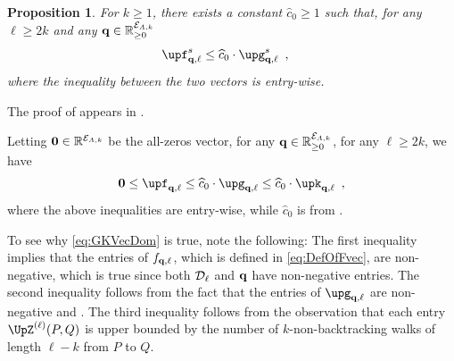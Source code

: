 \documentclass[11pt,reqno]{amsart}
\numberwithin{equation}{section}
\newtheorem{proposition}[theorem]{Proposition}
\newcommand{\cE}{{\mathcal{E}}}
\newcommand{\applegreen}[1]{ {\color{applegreen}#1}}
\newcommand{\amethyst}[1]{{\color{amethyst}#1} }
\newcommand{\bluepigment}[1]{{\color{blue(pigment)}#1}}
\newcommand{\darkmagenta}[1]{{\color{darkmagenta}#1}}
\newcommand{\goldenbrown}[1]{{\color{goldenbrown}#1}}
\newcommand{\iris}[1]{{\color{iris}#1}}
\newcommand{\ExtV}{\iris{\cE}}
\newcommand{\pfs}{\darkmagenta{s}}
\renewcommand{\applegreen}[1]{#1}
\renewcommand{\amethyst}[1]{#1}
\renewcommand{\bluepigment}[1]{#1}
\renewcommand{\darkmagenta}[1]{#1}
\renewcommand{\goldenbrown}[1]{#1}
\renewcommand{\iris}[1]{#1}
\newcommand{\kk}{\bluepigment{k}}
\newcommand{\kell}{{\color{green(pigment)}\ell}}%
\newcommand{\kP}{\goldenbrown{P}}
\newcommand{\kQ}{\amethyst{Q}}
\renewcommand{\kk}{k}
\renewcommand{\kell}{\ell}
\renewcommand{\kP}{P}
\renewcommand{\kQ}{Q}
\begin{document}
\begin{proposition}\label{thrm:HC-VEntryBound}
For $\kk\geq 1$, there exists a constant $\widehat{c}_0\geq 1$ such that, for any $\kell\geq 2\kk$
 and any $\vtest \in \mathbb{R}^{\ExtV_{\Lambda,\kk}}_{\geq 0}$
\begin{align}\label{eq:thrm:HC-VEntryBoundBB}
 \vecF^{\pfs}_{\vtest, \kell} &\leq \widehat{c}_0 \cdot 
% 
\vecG^{\pfs}_{\vtest, \kell} \enspace, 
\end{align}
where the inequality between the two vectors is entry-wise.
\end{proposition}
The proof of  appears in .




%







Letting ${\bf 0}\in \mathbb{R}^{\ExtV_{\Lambda,\kk}}$ be the all-zeros vector, 
for any $\vtest \in \mathbb{R}^{\ExtV_{\Lambda,\kk}}_{\geq 0}$, for any $\kell\geq 2\kk$, we have 
\begin{align}\label{eq:GKVecDom}
{\bf 0}\leq \vecF_{\vtest, \kell} \leq \widehat{c}_0\cdot \vecG_{\vtest, \kell} \leq \widehat{c}_0\cdot \vecK_{\vtest, \kell}\enspace,
\end{align}
where the above inequalities are entry-wise, while $\widehat{c}_0$ is from .






To see why \eqref{eq:GKVecDom} is true, note the following: The first inequality implies that the entries of 
$f_{\vtest,\kell}$, which is defined in \eqref{eq:DefOfFvec}, are non-negative, which is true since both
$\ExtdInfMatrixL_{\kell}$ and $\vtest$ have non-negative entries. 
The second inequality follows from the fact that the entries of $\vecG_{\vtest,\kell}$ are non-negative and
 . 
The third inequality follows from the observation that each entry $\TAdj^{(\kell)}(\kP, \kQ)$ is upper bounded by the 
number of $\kk$-non-backtracking walks of length $\kell-\kk$ from $\kP$ to $\kQ$. 
\end{document}
